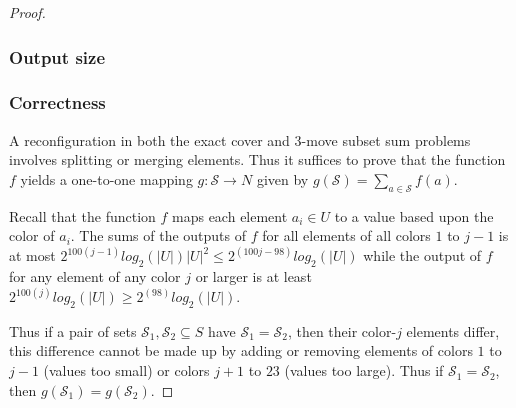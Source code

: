 \begin{proof}
\subsubsection{Output size}



\subsubsection{Correctness}
A reconﬁguration in both the exact cover and $3$-move subset sum problems involves splitting
or merging elements. Thus it suffices to prove that the function $f$ yields a one-to-one mapping $g : \mathcal{S} \rightarrow N$
given by $g(\mathcal{S}) = \sum_{a \in \mathcal{S}}^{} f(a)$.

Recall that the function $f$ maps each element $a_i \in U$ to a value based upon the color of $a_i$. The sums of
the outputs of $f$ for all elements of all colors $1$ to $j-1$ is at most $2^{100(j-1)} log_{2}(|U|)|U|^{2} \leq 2^{(100j-98)}log_{2}(|U|)$
while the output of $f$ for any element of any color $j$ or larger is at least $2^{100(j)} log_{2}(|U|) \geq 2^{(98)}log_{2}(|U|)$.

Thus if a pair of sets $\mathcal{S}_1, \mathcal{S}_2 \subseteq S$ have $\mathcal{S}_1 = \mathcal{S}_2$, then their color-$j$ elements
differ, this difference cannot be made up by adding or removing elements of colors $1$ to $j-1$ (values too small) or colors $j + 1$ to $23$
(values too large). Thus if $\mathcal{S}_1 = \mathcal{S}_2$, then $g(\mathcal{S}_1) = g(\mathcal{S}_2)$.


\end{proof}




